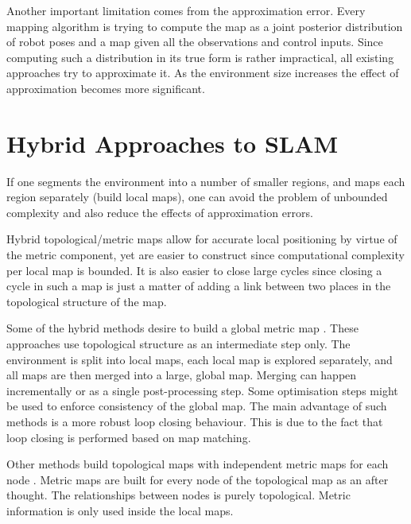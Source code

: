 Another important limitation comes from the approximation error. Every
mapping algorithm is trying to compute the map as a joint posterior
distribution of robot poses and a map given all the observations and
control inputs. Since computing such a distribution in its true form
is rather impractical, all existing approaches try to approximate it.
As the environment size increases the effect of approximation becomes
more significant.



\section{Hybrid Approaches to SLAM} 

If one segments the environment into a number of smaller regions, and
maps each region separately (build local maps), one can avoid the
problem of unbounded complexity and also reduce the effects of
approximation errors.

Hybrid topological/metric maps
\cite{fergusson2003,bosse03atlas,Thrun98a} allow for accurate local
positioning by virtue of the metric component, yet are easier to
construct since computational complexity per local map is bounded. It
is also easier to close large cycles since closing a cycle in such a
map is just a matter of adding a link between two places in the
topological structure of the map.


Some of the hybrid methods desire to build a global metric map
\cite{Thrun98a, slam_thrun98b}. These approaches use topological
structure as an intermediate step only. The environment is split into
local maps, each local map is explored separately, and all maps are
then merged into a large, global map. Merging can happen incrementally
or as a single post-processing step. Some optimisation steps might be
used to enforce consistency of the global map. The main advantage of
such methods is a more robust loop closing behaviour. This is due to
the fact that loop closing is performed based on map matching.

Other methods build topological maps with independent metric maps for
each node \cite{Cho01,Kuipers00}. Metric maps are built for every node of the
topological map as an after thought. The relationships between nodes
is purely topological. Metric information is only used inside the
local maps.

